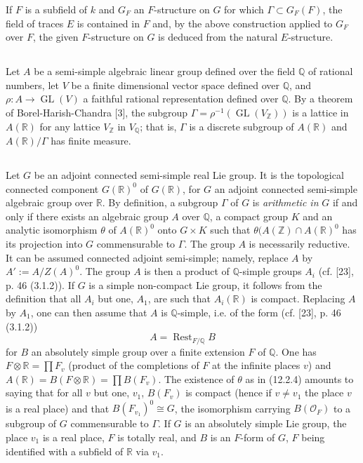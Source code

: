 \documentclass[12pt,a4paper]{article}
\theoremstyle{plain}
\theoremstyle{definition}
\theoremstyle{remark}
\DeclareMathOperator{\Rest}{Rest}
\DeclareMathOperator{\GL}{GL}
\begin{document}
If $F$ is a subfield of $k$ and $G_F$ an $F$-structure on $G$ for which $\Gamma \subset G_F(F)$, the field of traces $E$ is contained in $F$ and, by the above construction applied to $G_F$ over $F$, the given $F$-structure on $G$ is deduced from the natural $E$-structure.

\subsection{}
\label{12.2.3}

Let $A$ be a semi-simple algebraic linear group defined over the field $\mathbb{Q}$ of rational numbers, let $V$ be a finite dimensional vector space defined over $\mathbb{Q}$, and $\rho : A \to \GL(V)$ a faithful rational representation defined over $\mathbb{Q}$. By a theorem of Borel-Harish-Chandra [3], the subgroup $\Gamma = \rho^{-1}(\GL(V_\mathbb{Z}))$ is a lattice in $A(\mathbb{R})$ for any lattice $V_\mathbb{Z}$ in $V_\mathbb{Q}$; that is, $\Gamma$ is a discrete subgroup of $A(\mathbb{R})$ and $A(\mathbb{R})/\Gamma$ has finite measure.

\subsection{}
\label{12.2.4}

Let $G$ be an adjoint connected semi-simple real Lie group. It is the topological connected component $G(\mathbb{R})^0$ of $G(\mathbb{R})$, for $G$ an adjoint connected semi-simple algebraic group over $\mathbb{R}$. By definition, a subgroup $\Gamma$ of $G$ is \emph{arithmetic in} $G$ if and only if there exists an algebraic group $A$ over $\mathbb{Q}$, a compact group $K$ and an analytic isomorphism $\theta$ of $A(\mathbb{R})^0$ onto $G \times K$ such that $\theta(A(\mathbb{Z}) \cap A(\mathbb{R})^0$ has its projection into $G$ commensurable to $\Gamma$. The group $A$ is necessarily reductive. It can be assumed connected adjoint semi-simple; namely, replace $A$ by $A' := A/Z(A)^0$. The group $A$ is then a product of $\mathbb{Q}$-simple groups $A_i$ (cf. [23], p. 46 (3.1.2)). If $G$ is a simple non-compact Lie group, it follows from the definition that all $A_i$ but one, $A_1$, are such that $A_i(\mathbb{R})$ is compact. Replacing $A$ by $A_1$, one can then assume that $A$ is $\mathbb{Q}$-simple, i.e. of the form (cf. [23], p. 46 (3.1.2))
\[
A = \Rest_{F/\mathbb{Q}} B
\]
for $B$ an absolutely simple group over a finite extension $F$ of $\mathbb{Q}$. One has $F \otimes \mathbb{R} = \prod F_v$ (product of the completions of $F$ at the infinite places $v$) and $A(\mathbb{R}) = B(F \otimes \mathbb{R}) = \prod B(F_v)$. The existence of $\theta$ as in (12.2.4) amounts to saying that for all $v$ but one, $v_1$, $B(F_v)$ is compact (hence if $v \neq v_1$ the place $v$ is a real place) and that $B(F_{v_1})^0 \cong G$, the isomorphism carrying $B(\mathcal{O}_F)$ to a subgroup of $G$ commensurable to $\Gamma$. If $G$ is an absolutely simple Lie group, the place $v_1$ is a real place, $F$ is totally real, and $B$ is an $F$-form of $G$, $F$ being identified with a subfield of $\mathbb{R}$ via $v_1$.
\end{document}
